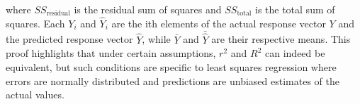 where \(SS_{\text{residual}}\) is the residual sum of squares and \(SS_{\text{total}}\) is the total sum of squares. Each \(Y_i\) and \(\hat{Y}_i\) are the ith elements of the actual response vector \(Y\) and the predicted response vector \(\hat{Y}\), while \(\bar{Y}\) and \(\bar{\hat{Y}}\) are their respective means. This proof highlights that under certain assumptions, \( r^2 \) and \( R^2 \) can indeed be equivalent, but such conditions are specific to least squares regression where errors are normally distributed and predictions are unbiased estimates of the actual values.
